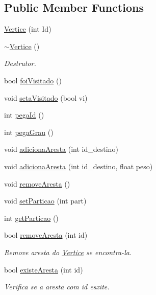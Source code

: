 \subsection*{Public Member Functions}
\begin{DoxyCompactItemize}
\item 
\hyperlink{class_vertice_a230fd673ca5c794ff5d4fb53dd98ca7b}{Vertice} (int Id)
\item 
\hyperlink{class_vertice_ae231694dc3ff35959b5b20b879b4678a}{$\sim$\-Vertice} ()
\begin{DoxyCompactList}\small\item\em Destrutor. \end{DoxyCompactList}\item 
bool \hyperlink{class_vertice_aa0003425b8eb7ec6c3d5cd915a88afbc}{foi\-Visitado} ()
\item 
void \hyperlink{class_vertice_aca656c6efc4478a597d0e2ced0d392e9}{seta\-Visitado} (bool vi)
\item 
int \hyperlink{class_vertice_abc05ac8e91788aa9fdd903bbbc6e37af}{pega\-Id} ()
\item 
int \hyperlink{class_vertice_a926f0ba5d1a1b202df2e91712fa3f3d0}{pega\-Grau} ()
\item 
void \hyperlink{class_vertice_a6d4a399b37a0126660fe73c7ba97654a}{adiciona\-Aresta} (int id\-\_\-destino)
\item 
void \hyperlink{class_vertice_acb35c8eb7a44fb79b2bbc3b77ac018ce}{adiciona\-Aresta} (int id\-\_\-destino, float peso)
\item 
void \hyperlink{class_vertice_a4024393ae653b1cc889780ae1801a152}{remove\-Aresta} ()
\item 
void \hyperlink{class_vertice_a3fd85d9c14304c70c0def1adb65b8fde}{set\-Particao} (int part)
\item 
int \hyperlink{class_vertice_a5de6dd2ebceaeca99f02c2cf8ec2f38d}{get\-Particao} ()
\item 
bool \hyperlink{class_vertice_a440a8735f0d7296bd9108951558bc30b}{remove\-Aresta} (int id)
\begin{DoxyCompactList}\small\item\em Remove aresta do \hyperlink{class_vertice}{Vertice} se encontra-\/la. \end{DoxyCompactList}\item 
bool \hyperlink{class_vertice_a6ec71f04fba51e1f7aab78fbe6fed820}{existe\-Aresta} (int id)
\begin{DoxyCompactList}\small\item\em Verifica se a aresta com id esxite. \end{DoxyCompactList}\item 

\end{DoxyCompactItemize}
